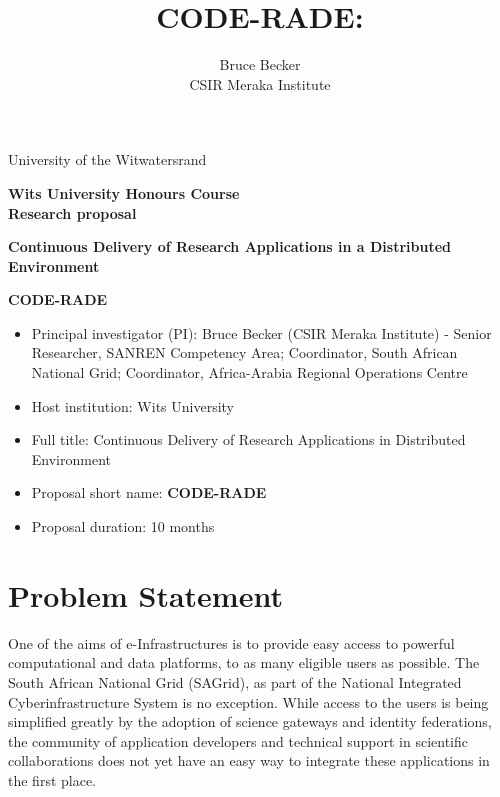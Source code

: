 \documentclass[oneside, a4paper, onecolumn, 11pt]{article}
\title{CODE-RADE:\\ }
\author{Bruce Becker\\ CSIR Meraka Institute}
\begin{document}
\noindent
University of the Witwatersrand

\vfill

\begin{center}
\large{\textbf{Wits University Honours Course\\
Research proposal }
}
\vfill

\LARGE{\textbf{Continuous Delivery of Research Applications in a Distributed Environment }}

\vfill

\LARGE{\textbf{CODE-RADE}}

\vfill

\end{center}

\vfill

\begin{itemize}
\item Principal investigator (PI): Bruce Becker (CSIR Meraka Institute) - Senior Researcher, SANREN Competency Area; Coordinator, South African National Grid; Coordinator, Africa-Arabia Regional Operations Centre
\item Host institution: Wits University
\item Full title: Continuous Delivery of Research Applications in Distributed Environment
\item Proposal short name: \bf{CODE-RADE}
\item Proposal duration: 10 months
\end{itemize}


\vfill

\noindent
\section{Problem Statement}
One of the aims of e-Infrastructures is to provide easy access to powerful computational and data platforms, to as many eligible users as possible. The South African National Grid (SAGrid), as part of the National Integrated Cyberinfrastructure System is no exception. While access to the users is being simplified greatly by the adoption of science gateways and identity federations, the community of application developers and technical support in scientific collaborations does not yet have an easy way to integrate these applications in the first place.
\end{document}
